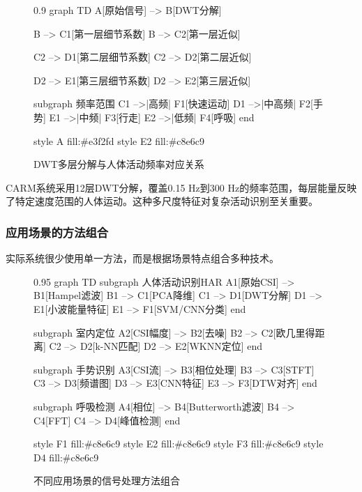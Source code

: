 \begin{figure}[htbp]
    \centering
    \begin{mmd}{0.9\textwidth}
graph TD
    A[原始信号] --> B[DWT分解]
    
    B --> C1[第一层细节系数]
    B --> C2[第一层近似]
    
    C2 --> D1[第二层细节系数]
    C2 --> D2[第二层近似]
    
    D2 --> E1[第三层细节系数]
    D2 --> E2[第三层近似]
    
    subgraph 频率范围
        C1 -->|高频| F1[快速运动]
        D1 -->|中高频| F2[手势]
        E1 -->|中频| F3[行走]
        E2 -->|低频| F4[呼吸]
    end
    
    style A fill:#e3f2fd
    style E2 fill:#c8e6c9
    \end{mmd}
    \caption{DWT多层分解与人体活动频率对应关系}
    \label{fig:dwt-decomposition}
\end{figure}

CARM系统采用12层DWT分解，覆盖0.15 Hz到300 Hz的频率范围，每层能量反映了特定速度范围的人体运动。这种多尺度特征对复杂活动识别至关重要。

\subsubsection{应用场景的方法组合}

实际系统很少使用单一方法，而是根据场景特点组合多种技术。

\begin{figure}[htbp]
    \centering
    \begin{mmd}{0.95\textwidth}
graph TD
    subgraph 人体活动识别HAR
        A1[原始CSI] --> B1[Hampel滤波]
        B1 --> C1[PCA降维]
        C1 --> D1[DWT分解]
        D1 --> E1[小波能量特征]
        E1 --> F1[SVM/CNN分类]
    end
    
    subgraph 室内定位
        A2[CSI幅度] --> B2[去噪]
        B2 --> C2[欧几里得距离]
        C2 --> D2[k-NN匹配]
        D2 --> E2[WKNN定位]
    end
    
    subgraph 手势识别
        A3[CSI流] --> B3[相位处理]
        B3 --> C3[STFT]
        C3 --> D3[频谱图]
        D3 --> E3[CNN特征]
        E3 --> F3[DTW对齐]
    end
    
    subgraph 呼吸检测
        A4[相位] --> B4[Butterworth滤波]
        B4 --> C4[FFT]
        C4 --> D4[峰值检测]
    end
    
    style F1 fill:#c8e6c9
    style E2 fill:#c8e6c9
    style F3 fill:#c8e6c9
    style D4 fill:#c8e6c9
    \end{mmd}
    \caption{不同应用场景的信号处理方法组合}
    \label{fig:application-pipelines}
\end{figure}

